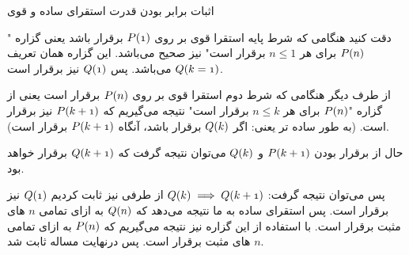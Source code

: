 \begin{EXTRA}{اثبات برابر بودن قدرت استقرای ساده و قوی}
\begin{enumerate}
                دقت کنید هنگامی که شرط پایه استقرا قوی بر روی
                $\mathnormal{P(1)}$ 
                برقرار باشد یعنی گزاره
                "$\mathnormal{P(n)}$
                برای هر
                $n \leq 1$
                برقرار است" نیز صحیح می‌باشد.
                این گزاره همان تعریف
                $\mathnormal{Q(k = 1)}$
                می‌باشد.
                پس
                $\mathnormal{Q(1)}$
                نیز برقرار است.


                از طرف دیگر هنگامی که شرط دوم استقرا قوی بر روی
                $\mathnormal{P(n)}$ 
                برقرار است یعنی از گزاره
                "$\mathnormal{P(n)}$
                برای هر
                $n \leq k$
                برقرار است" نتیجه می‌گیریم که
                $\mathnormal{P(k + 1)}$
                نیز برقرار است.
                (به طور ساده تر یعنی: اگر
                $\mathnormal{Q(k)}$
                برقرار باشد، آنگاه
                $\mathnormal{P(k + 1)}$
                برقرار است).
                
                حال از برقرار بودن
                $\mathnormal{P(k + 1)}$
                و 
                $\mathnormal{Q(k)}$
                می‌توان نتیجه گرفت که
                $\mathnormal{Q(k + 1)}$
                برقرار خواهد بود.

                پس می‌توان نتیجه گرفت:
                $\mathnormal{Q(k)} \implies \mathnormal{Q(k + 1)}$
                از طرفی نیز ثابت کردیم
                $\mathnormal{Q(1)}$
                نیز برقرار است.
                پس استقرای ساده به ما نتیجه می‌دهد که
                $\mathnormal{Q(n)}$
                به ازای تمامی
                $n$
                های مثبت برقرار است. با استفاده از این گزاره نیز نتیجه می‌گیریم که
                $\mathnormal{P(n)}$
                به ازای تمامی
                $n$
                های مثبت برقرار است.
                پس درنهایت مساله ثابت شد.
                
            \end{enumerate} 
        
    \end{EXTRA}










